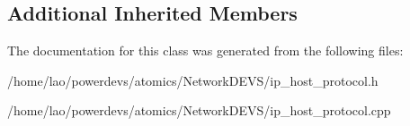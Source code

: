 \subsection*{Additional Inherited Members}


The documentation for this class was generated from the following files\+:\begin{DoxyCompactItemize}
\item 
/home/lao/powerdevs/atomics/\+Network\+D\+E\+V\+S/ip\+\_\+host\+\_\+protocol.\+h\item 
/home/lao/powerdevs/atomics/\+Network\+D\+E\+V\+S/ip\+\_\+host\+\_\+protocol.\+cpp\end{DoxyCompactItemize}
